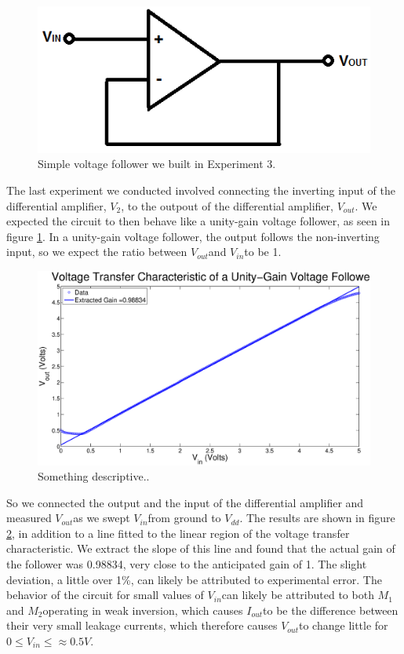\documentclass{article}
\newcommand{\Vout}{{$V_{out}$}}
\newcommand{\Vtwo}{{$V_{2}$}}
\newcommand{\Vdd}{{$V_{dd}$}}
\newcommand{\Iout}{{$I_{out}$}}
\newcommand{\Vin}{{$V_{in}$}}
\newcommand{\Mone}{{$M_{1}$}}
\newcommand{\Mtwo}{{$M_{2}$}}
\begin{document}
\begin{figure}[H]
\centering
\includegraphics[width=0.5\linewidth]{../Figures/Voltage-follower}
\caption{Simple voltage follower we built in Experiment 3.}
\label{fig:voltagefollow}
\end{figure}

The last experiment we conducted involved connecting the inverting input of the differential amplifier, \Vtwo, to the outpout of the differential amplifier, \Vout. We expected the circuit to then behave like a unity-gain voltage follower, as seen in figure \ref{fig:voltagefollow}. In a unity-gain voltage follower, the output follows the non-inverting input, so we expect the ratio between \Vout and \Vin to be 1.

\begin{figure}[H]
\centering
\includegraphics[width=\linewidth]{../Figures/Exp3P1.eps}
\caption{Something descriptive..}
\label{fig:exp3p1}
\end{figure}

So we connected the output and the input of the differential amplifier and measured \Vout as we swept \Vin from ground to \Vdd. The results are shown in figure \ref{fig:exp3p1}, in addition to a line fitted to the linear region of the voltage transfer characteristic. We extract the slope of this line and found that the actual gain of the follower was 0.98834, very close to the anticipated gain of 1. The slight deviation, a little over 1\%, can likely be attributed to experimental error. The behavior of the circuit for small values of \Vin can likely be attributed to both \Mone and \Mtwo operating in weak inversion, which causes \Iout to be the difference between their very small leakage currents, which therefore causes \Vout to change little for $0 \leq V_{in} \leq \approx 0.5 V.$
\end{document}
